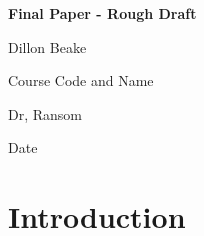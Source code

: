 \documentclass[12pt]{article}
\begin{document}
\begin{center}
    \large\textbf{Final Paper - Rough Draft }
    
    \vspace{0.5cm}
    
    Dillon Beake 
    
    \vspace{0.5cm}
    
    Course Code and Name
    
   Dr, Ransom 
    
    \vspace{0.5cm}
    
    Date
\end{center}

\doublespacing

\section*{Introduction}
\end{document}
